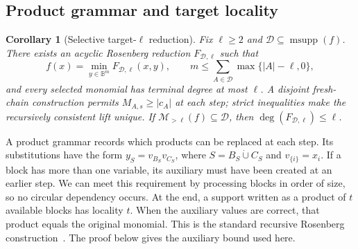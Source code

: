 \documentclass[a4paper,onecolumn,11pt,unpublished]{quantumarticle}
\newtheorem{corollary}[corollary]{Corollary}
\theoremstyle{remark}
\begin{document}
\subsection{Product grammar and target locality}
\label{app:product-grammar}
\label{app:target-locality-proof}

\begin{corollary}[Selective target-\(\ell\) reduction]
\label{cor:selective-target-locality}
Fix \(\ell\geq2\) and \(\mathcal D\subseteq\operatorname{msupp}(f)\).  There
exists an acyclic Rosenberg reduction \(F_{\mathcal D,\ell}\) such that
\begin{equation}
  f(x)=\min_{y\in\mathbb B^m}F_{\mathcal D,\ell}(x,y),
  \qquad
  m\leq\sum_{A\in\mathcal D}\max\{|A|-\ell,0\},
  \label{eq:target-locality-bound}
\end{equation}
and every selected monomial has terminal degree at most \(\ell\).  A disjoint
fresh-chain construction permits \(M_{A,s}\geq|c_A|\) at each step; strict
inequalities make the recursively consistent lift unique.  If
\(\mathcal M_{>\ell}(f)\subseteq\mathcal D\), then
\(\deg(F_{\mathcal D,\ell})\leq\ell\).
\end{corollary}

A product grammar records which products can be replaced at each step.
Its substitutions have the form \(y_S=v_{B_S}v_{C_S}\), where
\(S=B_S\mathbin{\dot\cup}C_S\) and \(v_{\{i\}}=x_i\).
If a block has more than one variable, its auxiliary must have been created
at an earlier step. We can meet this requirement by processing blocks in
order of size, so no circular dependency occurs.
At the end, a support written as a product of \(t\) available blocks has
locality \(t\). When the auxiliary values are correct, that product equals
the original monomial. This is the standard recursive Rosenberg
construction~\cite{Rosenberg1975,BorosGruber2014}. The proof below gives the
auxiliary bound used here.
\end{document}
